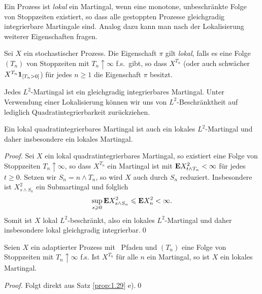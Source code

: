 Ein Prozess ist \textit{lokal} ein Martingal, wenn eine monotone, unbeschränkte
Folge von Stoppzeiten existiert, so dass alle gestoppten Prozesse gleichgradig
integrierbare Martingale sind. Analog dazu kann man nach der Lokalisierung
weiterer Eigenschaften fragen.

\begin{defn}
\label{defn:1.20}
Sei $X$ ein stochastischer Prozess. Die Eigenschaft $\pi$ gilt \emph{lokal},
falls es eine Folge $(T_n)$ von Stoppzeiten mit $T_n\uparrow\infty$ f.s.\ gibt, so
dass $X^{T_n}$ (oder auch schwächer $X^{T_n}\mathbf{1}_{[T_n>0]}$) für jedes $n\ge 1$
die Eigenschaft $\pi$ besitzt.\fish
\end{defn}

Jedes $L^2$-Martingal ist ein gleichgradig integrierbares Martingal.
Unter Verwendung einer Lokalisierung können wir uns von $L^2$-Beschränktheit auf
lediglich Quadratintegrierbarkeit zurückziehen.

\begin{prop}
\label{prop:1.30}
Ein lokal quadratintegrierbares Martingal ist auch ein
lokales $L^2$-Martingal und daher insbesondere ein
lokales Martingal.\fish
\end{prop}
\begin{proof}
Sei $X$ ein lokal quadratintegrierbares Martingal, so existiert eine Folge von
Stoppzeiten $T_n\uparrow\infty$, so dass $X^{T_n}$ ein Martingal ist mit $\mathbf{E}
X_{t\wedge T_n}^2<\infty$ für jedes $t\ge 0$. 
Setzen wir $S_n = n\wedge T_n$, so wird $X$ auch durch $S_n$ reduziert.
Insbesondere ist $X^2_{s\wedge S_n}$ ein Submartingal und folglich
\begin{align*}
\sup_{s\geqslant 0} \mathbf{E} X_{s\wedge S_n}^2
\leqslant \mathbf{E} X_{n}^2 < \infty.
\end{align*}
Somit ist $X$ lokal $L^2$-beschränkt, also ein lokales $L^2$-Martingal und
daher insbesondere lokal gleichgradig integrierbar.\qed
\end{proof}
%  

\begin{prop}
\label{prop:1.31}
 Seien $X$ ein adaptierter Prozess mit \cadlag\ Pfaden und
  $(T_n)$ eine Folge von Stoppzeiten mit $T_n \uparrow\infty$ f.s. Ist
  $X^{T_n}$ für alle $n$ ein Martingal, so ist $X$ ein lokales Martingal.
\end{prop}
\begin{proof}
Folgt direkt aus Satz \ref{prop:1.29} e).\qed 
\end{proof}

